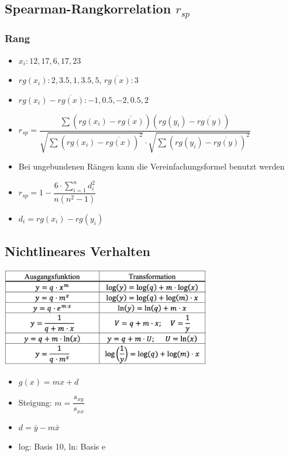 \documentclass[8pt,a4paper]{scrartcl}
\begin{document}
\begin{multicols*}{3}
			\subsection{Spearman-Rangkorrelation $r_{sp}$}		
					
				\subsubsection{Rang}		
					\begin{itemize}\itemsep0pt				
					\item $x_{i}: 12, 17, 6, 17, 23$
					\item $rg(x_{i}): 2, 3.5, 1, 3.5, 5$,  $\overline{rg(x)}: 3$
					\item $rg(x_{i})-\overline{rg(x)}: -1, 0.5, -2, 0.5, 2$
					\item $r_{sp}=\dfrac{\sum (rg(x_{i})-\overline{rg(x)})(rg(y_{i})-\overline{rg(y)})}{\sqrt{\sum (rg(x_{i})-\overline{rg(x)})^{2}} \cdot \sqrt{\sum (rg(y_{i})-\overline{rg(y)})^{2}}}$
					\item Bei ungebundenen Rängen kann die Vereinfachungsformel benutzt werden
					\item $r_{sp}=1-\dfrac{6\cdot \sum_{i=1}^{n}d_{i}^{2}}{n(n^{2}-1)}$
					\item $d_{i} = rg(x_{i})-rg(y_{i})$
					
				\end{itemize}
				
			 \subsection{Nichtlineares Verhalten}
			     \includegraphics[height=4.3cm]{img/regression1.png}
			     \begin{itemize}\itemsep0pt				
					\item $g(x) = mx + d$
					\item Steigung: $m = \dfrac{s_{xy}}{s_{xx}}$
					\item $d = \bar{y} - m\bar{x}$
					\item log: Basis 10, ln: Basis e
				\end{itemize}



\end{multicols*}
\end{document}

